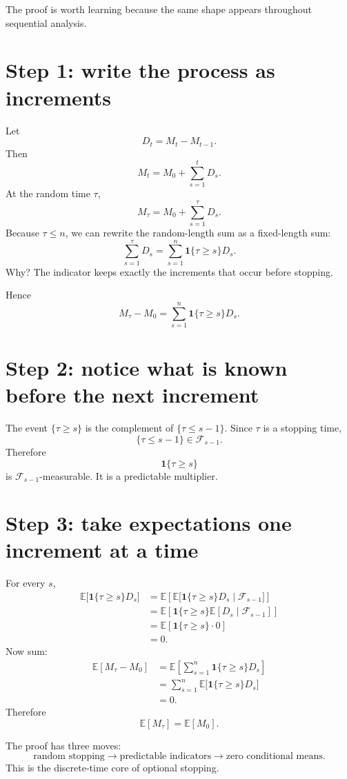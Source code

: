 \documentclass[en,nofont,11pt]{elegantbook}
\newcommand{\E}{\mathbb{E}}
\newcommand{\one}{\mathbf{1}}
\newcommand{\F}{\mathcal{F}}
\begin{document}
The proof is worth learning because the same shape appears throughout sequential analysis.

\section{Step 1: write the process as increments}

Let
\[
D_t=M_t-M_{t-1}.
\]
Then
\[
M_t=M_0+\sum_{s=1}^{t}D_s.
\]
At the random time $\tau$,
\[
M_\tau=M_0+\sum_{s=1}^{\tau}D_s.
\]
Because $\tau\le n$, we can rewrite the random-length sum as a fixed-length sum:
\[
\sum_{s=1}^{\tau}D_s
=
\sum_{s=1}^{n}\one\{\tau\ge s\}D_s.
\]
Why? The indicator keeps exactly the increments that occur before stopping.

Hence
\[
M_\tau-M_0
=
\sum_{s=1}^{n}\one\{\tau\ge s\}D_s.
\]

\section{Step 2: notice what is known before the next increment}

The event $\{\tau\ge s\}$ is the complement of $\{\tau\le s-1\}$. Since $\tau$ is a stopping time,
\[
\{\tau\le s-1\}\in\F_{s-1}.
\]
Therefore
\[
\one\{\tau\ge s\}
\]
is $\F_{s-1}$-measurable. It is a predictable multiplier.

\section{Step 3: take expectations one increment at a time}

For every $s$,
\begin{align*}
\E\bigl[\one\{\tau\ge s\}D_s\bigr]
&=\E\left[
\E\bigl[\one\{\tau\ge s\}D_s\mid\F_{s-1}\bigr]
\right]\\
&=\E\left[
\one\{\tau\ge s\}\E[D_s\mid\F_{s-1}]
\right]\\
&=\E\left[
\one\{\tau\ge s\}\cdot 0
\right]\\
&=0.
\end{align*}
Now sum:
\begin{align*}
\E[M_\tau-M_0]
&=\E\left[
\sum_{s=1}^{n}\one\{\tau\ge s\}D_s
\right]\\
&=\sum_{s=1}^{n}
\E\bigl[\one\{\tau\ge s\}D_s\bigr]\\
&=0.
\end{align*}
Therefore
\[
\boxed{\E[M_\tau]=\E[M_0].}
\]

\begin{patternbox}
The proof has three moves:
\[
\text{random stopping}
\to
\text{predictable indicators}
\to
\text{zero conditional means}.
\]
This is the discrete-time core of optional stopping.
\end{patternbox}
\end{document}
